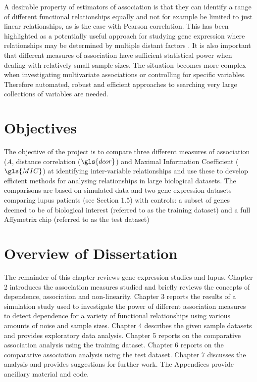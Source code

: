 \documentclass[a4paper, 12pt]{report}
\begin{document}
A desirable property of estimators of association is that they can identify a range of different functional relationships equally and not for example be limited to just linear relationships, as is the case with Pearson correlation. %
This has been highlighted as a potentially useful approach for studying gene expression where relationships may be determined by multiple distant factors  \cite{bigdata2012}. It is also important that different measures of association have sufficient statistical power when dealing with relatively small sample sizes. The situation becomes more complex when investigating multivariate associations or controlling for specific variables. Therefore automated, robust and efficient approaches to searching very large collections of variables are needed.

\section{Objectives}
The objective of the project is to compare three different measures of association ($A$, distance correlation ($\gls{dcor}$) and Maximal Information Coefficient ($\gls{MIC}$) at identifying inter-variable relationships and use these to develop efficient methods for analysing relationships in large biological datasets. The comparisons are based on simulated data and two gene expression datasets comparing lupus patients (see Section 1.5) with controls: a subset of genes deemed to be of biological interest (referred to as the training dataset) and a full Affymetrix chip (referred to as the test dataset)

\section{Overview of Dissertation}
The remainder of this chapter reviews gene expression studies and lupus. Chapter 2 introduces the association measures studied and briefly reviews the concepts of dependence, association and non-linearity. Chapter 3 reports the results of a simulation study used to investigate the power of different association measures to detect dependence for a variety of functional relationships using various amounts of noise and sample sizes. Chapter 4 describes the given sample datasets and provides exploratory data analysis. Chapter 5 reports on the comparative association analysis using the training dataset. Chapter 6 reports on the comparative association analysis using the test dataset. Chapter 7 discusses the analysis and provides suggestions for further work. The Appendices provide ancillary material and code.
\end{document}
